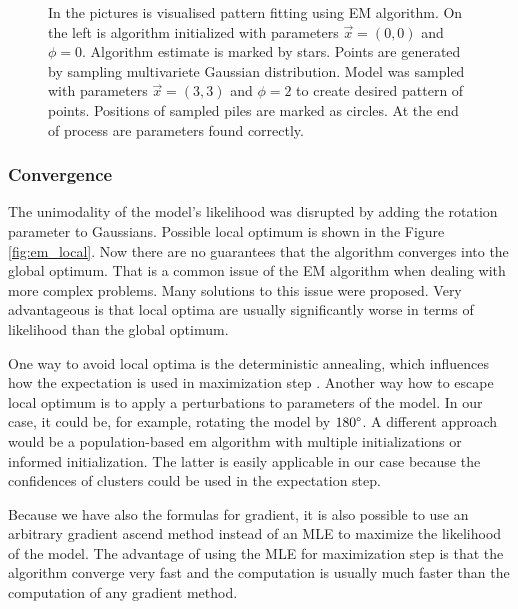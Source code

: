 \begin{figure}[H]
\begin{subfigure}{.49\textwidth}
	\end{subfigure}
	
	\caption[EM pattern fitting]{In the pictures is visualised pattern fitting using EM algorithm. On the left is algorithm initialized with parameters $\vec{x}=(0, 0)$ and $\phi=0$. Algorithm estimate is marked by stars. Points are generated by sampling multivariete Gaussian distribution. Model was sampled with parameters $\vec{x}=(3, 3)$ and $\phi=2$ to create desired pattern of points. Positions of sampled piles are marked as circles. At the end of process are parameters found correctly.}
	\label{fig:em_pattern}
\end{figure}

\subsubsection{Convergence}
The unimodality of the model's likelihood was disrupted by adding the rotation parameter to Gaussians. Possible local optimum is shown in the Figure \ref{fig:em_local}. Now there are no guarantees that the algorithm converges into the global optimum. That is a common issue of the EM algorithm when dealing with more complex problems. Many solutions to this issue were proposed. Very advantageous is that local optima are usually significantly worse in terms of likelihood than the global optimum. 

One way to avoid local optima is the deterministic annealing, which influences how the expectation is used in maximization step \cite{ueda1998}. Another way how to escape local optimum is to apply a perturbations to parameters of the model. In our case, it could be, for example, rotating the model by $180\degree$. A different approach would be a population-based em algorithm with multiple initializations or informed initialization. The latter is easily applicable in our case because the confidences of clusters could be used in the expectation step. 

Because we have also the formulas for gradient, it is also possible to use an arbitrary gradient ascend method instead of an MLE to maximize the likelihood of the model. The advantage of using the MLE for maximization step is that the algorithm converge very fast and the computation is usually much faster than the computation of any gradient method.

